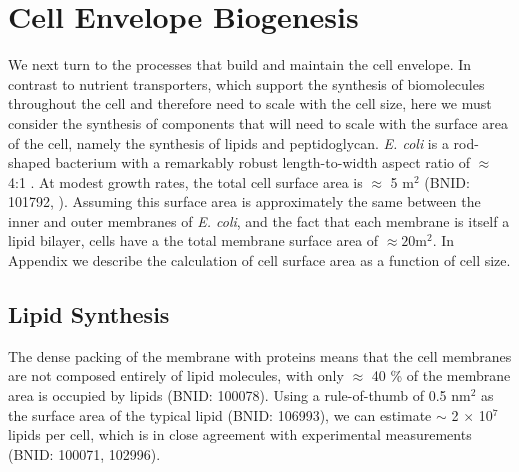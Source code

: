 \section{Cell Envelope Biogenesis}
We next turn to the processes that build and maintain the cell envelope. In
contrast to nutrient transporters, which support the synthesis of biomolecules
throughout the cell and therefore need to scale with the cell size, here we must
consider the synthesis of components that will need to scale with the surface
area of the cell, namely the synthesis of lipids and peptidoglycan. \textit{E.
coli} is a rod-shaped bacterium with a remarkably robust length-to-width aspect
ratio of $\approx$ 4:1 \citep{harris2018, ojkic2019}. At modest growth rates,
the total cell surface area is $\approx$ 5 \textmu m$^2$ (BNID: 101792,
\cite{milo2010}). Assuming this surface area is approximately the same between
the inner and outer membranes of \textit{E. coli}, and the fact that each
membrane is itself a lipid bilayer, cells have a the total membrane surface area
of $\approx 20$\textmu m$^2$. In Appendix  we describe
the calculation of cell surface area as a function of cell size.





\subsection{Lipid Synthesis}



The dense packing of the membrane with proteins means that the cell membranes
are not composed entirely of lipid molecules, with  only $\approx$ 40 \% of the
membrane area is occupied by lipids (BNID: 100078). Using a rule-of-thumb of 0.5
nm$^2$ as the surface area of the typical lipid (BNID: 106993), we can
estimate $\sim$ 2 $\times$ 10$^7$ lipids per cell, which is in close
agreement with experimental measurements (BNID: 100071, 102996).

